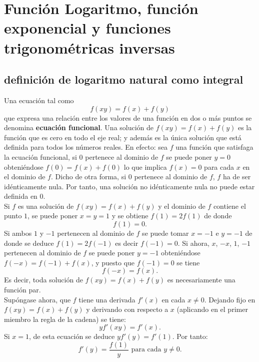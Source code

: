 \chapter{Función Logaritmo, función exponencial y funciones trigonométricas inversas}

\setcounter{section}{1}
\section{definición de logaritmo natural como integral}

Una ecuación tal como 
$$f(xy)=f(x)+f(y)$$ 
que expresa una relación entre los valores de una función en dos o más puntos se denomina \textbf{ecuación funcional}. Una solución de $f(xy)=f(x)+f(y)$ es la función que es cero en todo el eje real; y además es la única solución que está definida para todos los números reales. En efecto: sea $f$ una función que satisfaga la ecuación funcional, si $0$ pertenece al dominio de $f$ se puede poner $y=0$ obteniéndose $f(0)=f(x)+f(0)$ lo que implica $f(x)=0$ para cada $x$ en el dominio de $f$. Dicho de otra forma, si $0$ pertenece al dominio de $f$, $f$ ha de ser idénticamente nula. Por tanto, una solución no idénticamente nula no puede estar definida en $0$.\\

Si $f$ es una solución de $f(xy)=f(x)+f(y)$ y el dominio de $f$ contiene el punto $1$, se puede poner $x=y=1$ y se obtiene $f(1)=2f(1)$ de donde
$$f(1)=0.$$
Si ambos $1$ y $-1$ pertenecen al dominio de $f$ se puede tomar $x=-1$ e $y=-1$ de donde se deduce $f(1)=2f(-1)$ es decir $f(-1)=0$. Si ahora, $x$, $-x$, $1$, $-1$ pertenecen al dominio de $f$ se puede poner $y=-1$ obteniéndose $f(-x)=f(-1)+f(x)$, y puesto que $f(-1)=0$ se tiene
$$f(-x)=f(x).$$
Es decir, toda solución de $f(xy)=f(x)+f(y)$ es necesariamente una función par.\\

Supóngase ahora, que $f$ tiene una derivada $f'(x)$ en cada $x\neq 0$. Dejando fijo en $f(xy)=f(x)+f(y)$ y derivando con respecto a $x$ (aplicando en el primer miembro la regla de la cadena) se tiene:
$$yf'(xy)=f'(x).$$
Si $x=1$, de esta ecuación se deduce $yf'(y)=f'(1)$. Por tanto:
$$f'(y)=\dfrac{f(1)}{y}\mbox{ para cada }y\neq 0.$$

